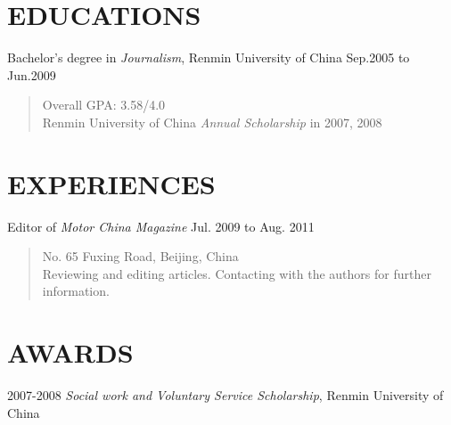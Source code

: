 \documentclass[11pt]{res} %
\begin{document}
 


\address{{\bf PRESENT ADDRESS} \\ Room 4-601, Building 10, North
  Jiashuyuan \\ Beijing Forestry University \\ Beijing China}

\address{{\bf CONTACTS} \\ Email:
  \href{mailto:zhaojia1222@gmail.com}{zhaojia1222@gmail.com}
  \\ Mobile: (+86) 1348-879-6279}

\begin{resume}

\linespread{1.2}\selectfont

\vspace{1cm}

\section{EDUCATIONS}
\vspace{4pt}
Bachelor's degree in \emph{Journalism}, Renmin University of China
\hfill Sep.2005 to Jun.2009
\begin{quote}
Overall GPA: 3.58/4.0 \\ Renmin University of China \emph{Annual
  Scholarship} in 2007, 2008
\end{quote}

\section{EXPERIENCES}
\vspace{4pt}

Editor of \emph{Motor China Magazine} \hfill Jul. 2009 to Aug. 2011
\begin{quote}
No. 65 Fuxing Road, Beijing, China \\ Reviewing and editing
articles. Contacting with the authors for further information.
\end{quote}

\section{AWARDS}
\vspace{4pt} 2007-2008 \emph{Social work and Voluntary Service
  Scholarship}, Renmin University of China


\end{resume}
\end{document}

